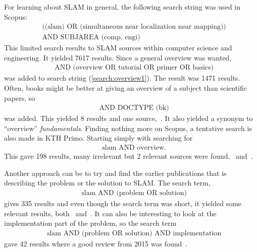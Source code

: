 For learning about SLAM in general, the following search string was used in Scopus:
\begin{align}
    \label{search:overview1}
    &\text{((slam) OR (simultaneous near localization near mapping))}\nonumber \\
    &\text{AND SUBJAREA (comp, engi)}
\end{align}
This limited search results to SLAM sources within computer science and
engineering. It yielded 7617 results. Since a general overview was wanted, 
\begin{align}
    \label{search:overview2}
    &\text{AND (overview OR tutorial OR primer OR basics)}
\end{align}
was added to search string (\ref{search:overview1}). The result was 1471 results.
Often, books might be better at giving an overview of a subject than scientific
papers, so
\begin{align}
    \label{search:overview3}
    &\text{AND DOCTYPE (bk)}
\end{align}
was added. This yielded 8 results and one source,~\cite{Kernbach20131}. It also
yielded a synonym to ``overview'' \textit{fundamentals}. 
Finding nothing more on Scopus, a tentative search is also made in KTH Primo.
Starting  simply with searching for
\begin{align}
    \label{search:overview4}
    &\text{slam AND overview}.
\end{align}
This gave 198 results, many irrelevant but 2 relevant sources were
found,~\cite{Frese2010} and~\cite{5769022}.

Another approach can be to try and find the earlier publications that is
describing the problem or the solution to SLAM\@. The search term,
\begin{align}
    \label{search:overview5}
    &\text{slam AND (problem OR solution)} 
\end{align}
gives 335 results and even though the search term was short, it yielded some
relevant results, both~\cite{938381} and~\cite{844732}. It can also be
interesting to look at the implementation part of the problem, so the search
term
\begin{align}
    \label{search:overview6}
    &\text{slam AND (problem OR solution) AND implementation} 
\end{align}
gave 42 results where a good review from 2015 was found~\cite{7482163}.
